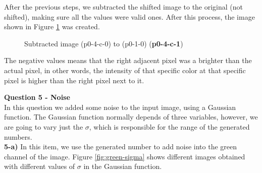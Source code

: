 \documentclass[12pt,a4paper]{article}
\begin{document}
After the previous steps, we subtracted the shifted image to the original (not shifted), making sure all the values were valid ones. After this process, the image shown in Figure \ref{fig:p0-4-c-1} was created.

\begin{figure}[!h]
	\centering
	{%
		\setlength{\fboxsep}{1pt}%
		\setlength{\fboxrule}{1pt}%
	}%
	\caption{Subtracted image (p0-4-c-0) to (p0-1-0) (\textbf{p0-4-c-1})}
	\label{fig:p0-4-c-1}
\end{figure}


The negative values means that the right adjacent pixel was a brighter than the actual pixel, in other words, the intensity of that specific color at that specific pixel is higher than the right pixel next to it.

\newpage

\textbf{Question 5 - Noise} \\

In this question we added some noise to the input image, using a Gaussian function. The Gaussian function normally depends of three variables, however, we are going to vary just the $\sigma$, which is responsible for the range of the generated numbers. \\

\textbf{5-a) }  In this item, we use the generated number to add noise into the green channel of the image. Figure \ref{fig:green-sigma} shows different images obtained with different values of $\sigma$ in the Gaussian function. \\
\end{document}
